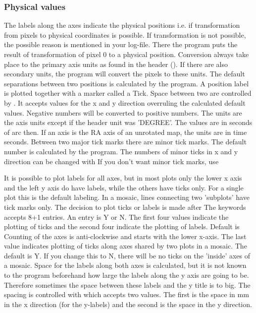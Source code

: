 \subsubsection*{Physical values}
              
The labels along the axes indicate the physical positions
i.e. if transformation from pixels to physical coordinates 
is possible. If transformation is not possible, the
possible reason is mentioned in your log-file. There the
program puts the result of transformation of pixel 0 to a 
physical position. Conversion always take place to the
primary axis units as found in the header (). If
there are also secondary units, the program will convert
the pixels to these units. The default separations between
two positions is calculated by the program. A position
label is plotted together with a marker called a Tick. Space
between two are controlled by . It accepts values for
the x and y direction overruling the calculated default
values. Negative numbers will be converted to positive
numbers. The units are the axis units except if the header
unit was 'DEGREE'. The values are in seconds of arc then.
If an axis is the RA axis of an unrotated map, the 
units are in time seconds. Between two major tick marks 
there are minor tick marks. The default number is
calculated by the program. The numbers of minor ticks in x 
and y direction can be changed with  If you don't 
want minor tick marks, use 
              
It is possible to plot labels for all axes, but in most
plots only the lower x axis and the left y axis do have
labels, while the others have ticks only. For a single
plot this is the default labeling. In a mosaic, lines
connecting two 'subplots' have tick marks only. The
decision to plot ticks or labels is made after 
The keywords accepts 8+1 entries. An entry is Y or N. The
first four values indicate the plotting of ticks and the
second four indicate the plotting of labels. Default is 
 \newline
Counting of the axes is anti-clockwise and starts with 
the lower x-axis. The last value indicates plotting of 
ticks along axes shared by two plots in a mosaic. The 
default is Y. If you change this to N, there will be no 
ticks on the 'inside' axes of a mosaic.
Space for the labels along both axes is calculated, but 
it is not known to the program beforehand how large the 
labels along the y axis are going to be. Therefore 
sometimes the space between these labels and the y title
is to big. The spacing is controlled with 
which accepts two values. The first is the space in mm
in the x direction (for the y-labels) and the second is
the space in the y direction.
              
